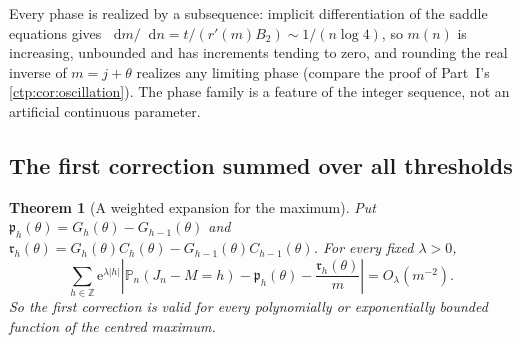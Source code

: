 \documentclass[11pt,a4paper]{article}
\numberwithin{equation}{section}
\newtheorem{theorem}{Theorem}[section]
\theoremstyle{definition}
\theoremstyle{remark}
\newcommand{\Z}{\mathbb Z}
\newcommand{\e}{\mathrm e}
\newcommand{\dd}{\mathop{}\!\mathrm d}
\newcommand{\PP}{\mathbb P}
\begin{document}
Every phase is realized by a subsequence: implicit differentiation of the
saddle equations gives $\dd m/\dd n=t/(r'(m)B_2)\sim1/(n\log4)$, so $m(n)$
is increasing, unbounded and has increments tending to zero, and rounding
the real inverse of $m=j+\theta$ realizes any limiting phase (compare the
proof of Part~I's \cref{ctp:cor:oscillation}). The phase family is a
feature of the integer sequence, not an artificial continuous parameter.

\subsection{The first correction summed over all thresholds}

\begin{theorem}[A weighted expansion for the maximum]\label{ctp:cl:thm:maxweighted}
Put $\mathfrak p_h(\theta)=G_h(\theta)-G_{h-1}(\theta)$ and
$\mathfrak r_h(\theta)=G_h(\theta)C_h(\theta)-G_{h-1}(\theta)C_{h-1}(\theta)$.
For every fixed $\lambda>0$,
\begin{equation}\label{ctp:cl:eq:weightedmax}
 \sum_{h\in\Z}\e^{\lambda|h|}\left|\PP_n(J_n-M=h)-\mathfrak p_h(\theta)
 -\frac{\mathfrak r_h(\theta)}m\right|=O_\lambda(m^{-2}).
\end{equation}
So the first correction is valid for every polynomially or exponentially
bounded function of the centred maximum.
\end{theorem}
\end{document}
